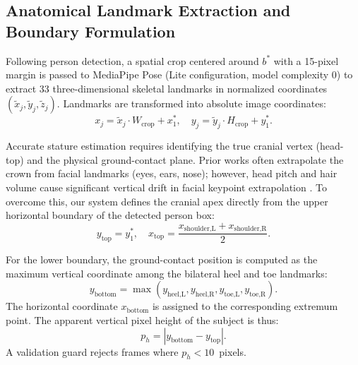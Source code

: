 \documentclass[conference]{IEEEtran}
\begin{document}
\subsection{Anatomical Landmark Extraction and Boundary Formulation}
Following person detection, a spatial crop centered around $b^*$ with a 15-pixel margin is passed to MediaPipe Pose (Lite configuration, model complexity 0) to extract 33 three-dimensional skeletal landmarks in normalized coordinates $(\tilde{x}_j, \tilde{y}_j, \tilde{z}_j)$. Landmarks are transformed into absolute image coordinates:
\begin{equation}
x_j = \tilde{x}_j \cdot W_{\text{crop}} + x_1^*, \quad y_j = \tilde{y}_j \cdot H_{\text{crop}} + y_1^*.
\end{equation}

Accurate stature estimation requires identifying the true cranial vertex (head-top) and the physical ground-contact plane. Prior works often extrapolate the crown from facial landmarks (eyes, ears, nose); however, head pitch and hair volume cause significant vertical drift in facial keypoint extrapolation \cite{maganti2022}. To overcome this, our system defines the cranial apex directly from the upper horizontal boundary of the detected person box:
\begin{equation}
y_{\text{top}} = y_1^*, \quad x_{\text{top}} = \frac{x_{\text{shoulder,L}} + x_{\text{shoulder,R}}}{2}.
\label{eq:headtop}
\end{equation}

For the lower boundary, the ground-contact position is computed as the maximum vertical coordinate among the bilateral heel and toe landmarks:
\begin{equation}
y_{\text{bottom}} = \max \left( y_{\text{heel,L}}, y_{\text{heel,R}}, y_{\text{toe,L}}, y_{\text{toe,R}} \right).
\label{eq:bottom}
\end{equation}
The horizontal coordinate $x_{\text{bottom}}$ is assigned to the corresponding extremum point. The apparent vertical pixel height of the subject is thus:
\begin{equation}
p_h = |y_{\text{bottom}} - y_{\text{top}}|.
\label{eq:pixelheight}
\end{equation}
A validation guard rejects frames where $p_h < 10$~pixels.
\end{document}
